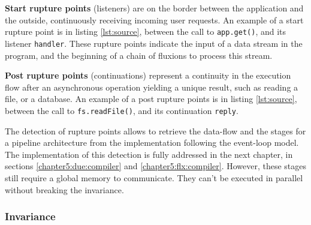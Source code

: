 \textbf{Start rupture points} (listeners) are on the border between the application and the outside, continuously receiving incoming user requests.
An example of a start rupture point is in listing \ref{lst:source}, between the call to \texttt{app.get()}, and its listener \texttt{handler}.
These rupture points indicate the input of a data stream in the program, and the beginning of a chain of fluxions to process this stream.

\textbf{Post rupture points} (continuations) represent a continuity in the execution flow after an asynchronous operation yielding a unique result, such as reading a file, or a database.
An example of a post rupture points is in listing \ref{lst:source}, between the call to \texttt{fs.readFile()}, and its continuation \texttt{reply}.






The detection of rupture points allows to retrieve the data-flow and the stages for a pipeline architecture from the implementation following the event-loop model.
The implementation of this detection is fully addressed in the next chapter, in sections \ref{chapter5:due:compiler} and \ref{chapter5:flx:compiler}.
However, these stages still require a global memory to communicate.
They can't be executed in parallel without breaking the invariance.





\subsubsection{Invariance}

